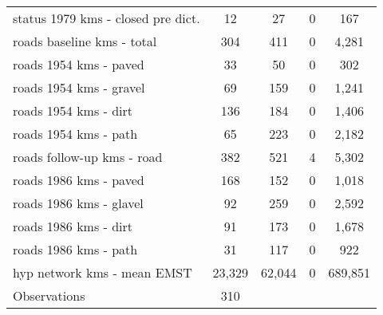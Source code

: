 \begin{table}[htbp]
\begin{tabular}{l*{1}{cccc}}
status 1979 kms - closed pre dict.&          12&          27&           0&         167\\
roads baseline kms - total&         304&         411&           0&       4,281\\
roads 1954 kms - paved&          33&          50&           0&         302\\
roads 1954 kms - gravel&          69&         159&           0&       1,241\\
roads 1954 kms - dirt&         136&         184&           0&       1,406\\
roads 1954 kms - path&          65&         223&           0&       2,182\\
roads follow-up kms - road&         382&         521&           4&       5,302\\
roads 1986 kms - paved&         168&         152&           0&       1,018\\
roads 1986 kms - glavel&          92&         259&           0&       2,592\\
roads 1986 kms - dirt&          91&         173&           0&       1,678\\
roads 1986 kms - path&          31&         117&           0&         922\\
hyp network kms - mean EMST &      23,329&      62,044&           0&     689,851\\
\hline
Observations        &         310&            &            &            \\
\hline\hline
\end{tabular}
\end{table}

